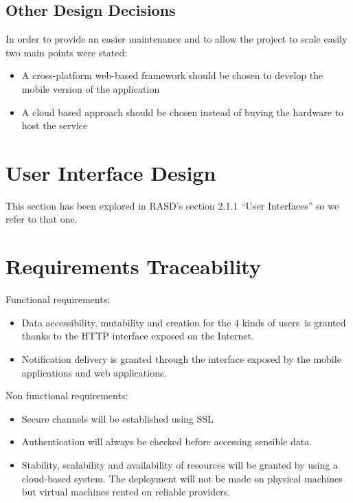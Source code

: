 \documentclass{article}
\begin{document}
\subsection{Other Design Decisions}
In order to provide an easier maintenance and to allow the project to scale easily two main points were stated: 
\begin{itemize}
	\item A cross-platform web-based framework should be chosen to develop the mobile version of the application 
	\item A cloud based approach should be chosen instead of buying the hardware to host the service
\end{itemize}

\section{User Interface Design}
This section has been explored in RASD's section 2.1.1 ``User Interfaces'' so we refer to that one.

\section{Requirements Traceability}

Functional requirements:
\begin{itemize}
	\item Data accessibility, mutability and creation for the 4 kinds of users\footnotemark\ is granted thanks to the HTTP interface exposed on the Internet.
	\item Notification delivery is granted through the interface exposed by the mobile applications and web applications.
\end{itemize}
Non functional requirements:
\begin{itemize}
	\item Secure channels will be established using SSL 
	\item Authentication will always be checked before accessing sensible data.
	\item Stability, scalability and availability of resources will be granted by using a cloud-based system. The deployment will not be made on physical machines but virtual machines rented on reliable providers.
\end{itemize}
\end{document}
